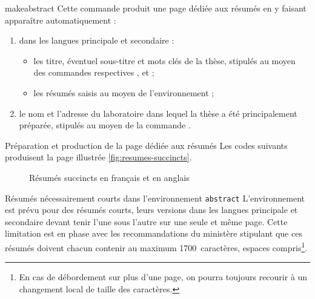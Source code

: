 \begin{docCommand}[doc description=\mandatory]{makeabstract}{}
  Cette commande produit une page dédiée aux résumés en y faisant
  apparaître automatiquement :
  \begin{enumerate}
  \item dans les langues principale et secondaire :
    \begin{itemize}
    \item les titre, éventuel sous-titre et mots clés de la thèse, stipulés au
      moyen des commandes respectives ,  et
       ;
    \item les résumés saisis au moyen de l'environnement  ;
    \end{itemize}
  \item le nom et l'adresse du laboratoire dans lequel la thèse a été
    principalement préparée, stipulés au moyen de la commande
    .
  \end{enumerate}
\end{docCommand}

\begin{dbexample}{Préparation et production de la page dédiée aux résumés}{}
  Les codes suivants produisent la page illustrée \vref{fig:resumes-succincts}.
\begin{bodycode}
\begin{abstract}
  \lipsum[1-2]
\end{abstract}
\begin{abstract}
  \lipsum[3-4]
\end{abstract}
\end{bodycode}
\end{dbexample}

\begin{figure}[htbp]
  \centering {}%
  \caption{Résumés succincts en français et en anglais}
  \label{fig:resumes-succincts}
\end{figure}

\begin{dbwarning}{Résumés nécessairement courts dans l'environnement
    \protect\lstinline+abstract+}{}
  L'environnement  est prévu pour des résumés courts, leurs
  versions dans les langues principale et secondaire devant tenir l'une sous
  l'autre sur une seule et même page. Cette limitation est en phase avec les
  recommandations du ministère stipulant que ces résumés doivent chacun
  contenir au maximum 1700~caractères, espaces compris\footnote{En cas de
    débordement sur plus d'une page, on pourra toujours recourir à un
    changement local de taille des caractères.}.
\end{dbwarning}

